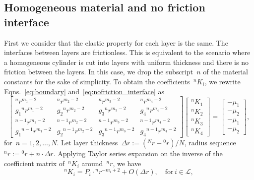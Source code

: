 \documentclass[preprint,10pt,times]{elsarticle}
\numberwithin{equation}{section}
\newcommand{\pr}[1]{\left( #1 \right)}
\renewcommand{\>}{$\Rightarrow$}
\begin{document}
\subsection{Homogeneous material and no friction interface}
\label{sec:1mat_no_friction}

First we consider that the elastic property for each layer is the same. The interfaces between layers are frictionless. This is equivalent to the scenario where a homogeneous cylinder is cut into layers with uniform thickness and there is no friction between the layers. In this case, we drop the subscript~$n$ of the material constants for the sake of simplicity. To obtain the coefficients~${}^{n}\!{K_{i}}$, we rewrite Eqns.~\eqref{eq:boundary} and~\eqref{eq:nofriction_interface} as
\begin{equation}
	\begin{bmatrix}
	{}^{n}\!{r}^{m_1 - 2} & {}^{n}\!{r}^{m_2 - 2} & {}^{n}\!{r}^{m_3 - 2} & {}^{n}\!{r}^{m_4 - 2} \\
	g_1 {}^{n}\!{r}^{m_1 - 2} & g_2 {}^{n}\!{r}^{m_2 - 2} & g_3 {}^{n}\!{r}^{m_3 - 2} & g_4 {}^{n}\!{r}^{m_4 - 2} \\
	{}^{n-1}\!{r}^{m_1 - 2} & {}^{n-1}\!{r}^{m_2 - 2} & {}^{n-1}\!{r}^{m_3 - 2} & {}^{n-1}\!{r}^{m_4 - 2} \\
	g_1 {}^{n-1}\!{r}^{m_1 - 2} & g_2 {}^{n-1}\!{r}^{m_2 - 2} & g_3 {}^{n-1}\!{r}^{m_3 - 2} & g_4 {}^{n-1}\!{r}^{m_4 - 2}
	\end{bmatrix}
	\begin{bmatrix}
	{}^{n}\!{K_{1}} \\ {}^{n}\!{K_{2}} \\ {}^{n}\!{K_{3}} \\ {}^{n}\!{K_{4}}
	\end{bmatrix}
	=
	\begin{bmatrix}
	-\mu_1 \\ -\mu_2 \\ -\mu_1 \\ -\mu_2
	\end{bmatrix},
	\label{eq:eqs of Kin_one_mat_no_friction}
\end{equation}
for~$n = 1,2,\dots,N$. Let layer thickness~$\Delta r := \pr{{}^{N}\!{r}-{}^{0}\!{r}}/N$, radius sequence~${}^{n}\!{r} := {}^{0}\!{r} + n\cdot \Delta r$. Applying Taylor series expansion on the inverse of the coefficient matrix of~${}^{n}\!{K_{i}}$ around~${}^{n}\!{r}$, we have
\begin{equation}
	{}^{n}\!{K_{i}} = P_i \cdot {}^{n}\!{r}^{-m_i + 2} + O(\Delta r), \quad \text{for}\, i \in \mathcal{L},
	\label{eq:single_mat_Ks}
\end{equation}
\end{document}
